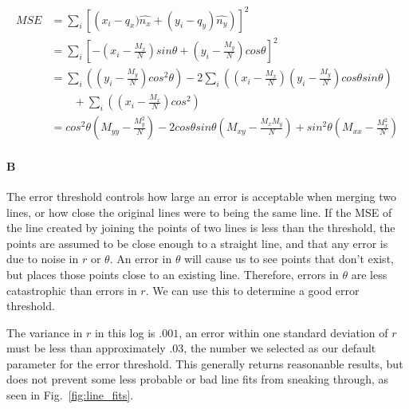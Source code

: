 \documentclass[12pt]{article}
\begin{document}
\begin{align*} MSE &=  \displaystyle\sum_i \left[\left(x_i - q_x)\hat{n_x} + (y_i - q_y)\hat{n_y}\right)\right]^2\\
&=\displaystyle\sum_i \left[-\left(x_i - \frac{M_x}{N}\right)sin\theta + \left(y_i - \frac{M_y}{N}\right)cos\theta\right]^2 \\
&=\displaystyle\sum_i \left(\left(y_i - \frac{M_y}{N}\right)cos^2\theta \right)
-2\displaystyle\sum_i \left(\left(x_i-\frac{M_x}{N}\right)\left(y_i - \frac{M_y}{N}\right)cos\theta sin\theta\right) \\
 &\qquad+ \displaystyle\sum_i \left(\left(x_i - \frac{M_x}{N}\right)cos^2\right) \\
&= cos^2\theta(M_{yy}-\frac{M_y^2}{N}) - 2cos\theta sin\theta(M_{xy}-\frac{M_xM_y}{N}) + sin^2\theta(M_{xx}-\frac{M_x^2}{N})
\end{align*}

\paragraph{B}
The error threshold controls how large an error is acceptable when merging
two lines, or how close the original lines were to being the same line.  If the
MSE of the line created by joining the points of two lines is less than the threshold,
the points are assumed to be close enough to a straight line, and that any error
is due to noise in $r$ or $\theta$.  An error in $\theta$ will cause us to see points
that don't exist, but places those points close to an existing line.  Therefore, errors in
$\theta$ are less catastrophic than errors in $r$.  We can use this to determine
a good error threshold.

The variance in $r$ in this log is $.001$, an error within one standard deviation
of $r$ must be less than approximately $.03$, the number we selected as our
default parameter for the error threshold.  This generally returns reasonanble results,
but does not prevent some less probable or bad line fits from sneaking through, as
seen in Fig.~\ref{fig:line_fits}.
\end{document}
